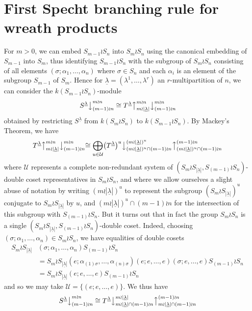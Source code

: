 \documentclass[ALCO,Unicode,published]{cedram}
\newcommand{\ul}[1]{\underline{#1}}
\begin{document}
\section{First Specht branching rule for wreath products}
For $m>0$, we can embed $S_{m-1} \wr S_n$ into $S_m \wr S_n$ using the canonical embedding of $S_{m-1}$ into $S_m$, thus identifying
$S_{m-1} \wr S_n$ with the subgroup of $S_m \wr S_n$ consisting of all elements $(\sigma;\alpha_1,\ldots,\alpha_n)$ where $\sigma \in S_n$
and each $\alpha_i$ is an element of the subgroup $S_{m-1}$ of $S_m$. Hence for $\ul{\lambda} = (\lambda^1,\ldots,\lambda^r)$ an
$r$-multipartition of $n$, we can consider the $k(S_{m-1} \wr S_n)$-module
\[ \left.S^{\ul{\lambda}}\right\downarrow^{m \wr n}_{(m-1) \wr n} \cong
T^{\ul{\lambda}}\bigl\uparrow^{m{\wr}n}_{m{\wr}|\ul{\lambda}|}\bigl\downarrow^{m \wr n}_{(m-1) \wr n}\]
obtained by restricting $S^{\ul{\lambda}}$ from $k(S_m \wr S_n)$ to $k(S_{m-1} \wr S_n)$. By  Mackey's Theorem, we have
\[
T^{\ul{\lambda}}\bigl\uparrow^{m{\wr}n}_{m{\wr}|\ul{\lambda}|}\bigl\downarrow^{m \wr n}_{(m-1) \wr n}\cong
\bigoplus_{u \in \mathcal{U}}\bigl(T^{\ul{\lambda}}\bigr)^u\bigl\downarrow^{(m{\wr}|\ul{\lambda}|)^u}_{(m{\wr}|\ul{\lambda}|)^u \cap (m-1) \wr n}
\bigl\uparrow^{(m-1) \wr n}_{(m{\wr}|\ul{\lambda}|)^u\cap (m-1) \wr n}
\]
where $\mathcal{U}$ represents a complete
non-redundant system of $(S_m \wr S_{|\ul{\lambda}|},S_{(m-1)} \wr S_n)$-double coset representatives in $S_m \wr S_n$, and where we allow
ourselves a slight abuse of notation by writing $(m \wr |\ul{\lambda}|)^u$ to represent the subgroup $(S_m \wr S_{|\ul{\lambda}|})^u$
conjugate to $S_m \wr S_{|\ul{\lambda}|}$ by $u$, and  $(m \wr |\ul{\lambda}|)^u \cap(m-1) \wr n$ for the intersection of this subgroup
with $S_{(m-1)} \wr S_n$. But it turns out that in fact the group $S_m \wr S_n$ is a single
$(S_m \wr S_{|\ul{\lambda}|},S_{(m-1)} \wr S_n)$-double coset. Indeed, choosing $(\sigma;\alpha_1,\ldots,\alpha_n)
\in S_m \wr S_n$, we have equalities of double cosets
\begin{align*}
S_m{\wr}S_{|\ul{\lambda}|}&(\sigma;\alpha_1,\ldots,\alpha_n)S_{(m-1)}{\wr}S_n\\
& = S_m{\wr}S_{|\ul{\lambda}|}(e;\alpha_{(1)\sigma},\ldots,\alpha_{(n)\sigma})(e;e,\ldots,e)(\sigma;e,\ldots,e)S_{(m-1)}{\wr}S_n\\
& = S_m{\wr}S_{|\ul{\lambda}|}(e;e,\ldots,e)S_{(m-1)}{\wr}S_n
\end{align*}
and so we may take $\mathcal{U} = \{(e;e,\ldots,e)\}$. We thus have
\[
\left.S^{\ul{\lambda}}\right\downarrow^{m \wr n}_{(m-1) \wr n} \cong
T^{\ul{\lambda}}\bigl\downarrow^{m{\wr}|\ul{\lambda}|}_{m{\wr}|\ul{\lambda}| \cap(m-1) \wr n}
\bigl\uparrow^{(m-1) \wr n}_{m{\wr}|\ul{\lambda}| \cap(m-1) \wr n}
\]
\end{document}

